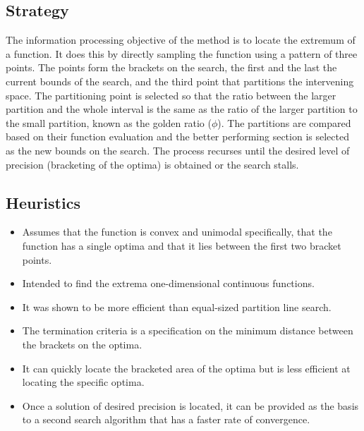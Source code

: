 \subsection{Strategy}
The information processing objective of the method is to locate the extremum of a function.
It does this by directly sampling the function using a pattern of three points. The points form the brackets on the search, the first and the last the current bounds of the search, and the third point that partitions the intervening space. The partitioning point is selected so that the ratio between the larger partition and the whole interval is the same as the ratio of the larger partition to the small partition, known as the golden ratio ($\phi$). The partitions are compared based on their function evaluation and the better performing section is selected as the new bounds on the search. The process recurses until the desired level of precision (bracketing of the optima) is obtained or the search stalls.

\subsection{Heuristics}

\begin{itemize}
	\item Assumes that the function is convex and unimodal specifically, that the function has a single optima and that it lies between the first two bracket points.
	\item Intended to find the extrema one-dimensional continuous functions.
	\item It was shown to be more efficient than equal-sized partition line search.
	\item The termination criteria is a specification on the minimum distance between the brackets on the optima.
	\item It can quickly locate the bracketed area of the optima but is less efficient at locating the specific optima.
	\item Once a solution of desired precision is located, it can be provided as the basis to a second search algorithm that has a faster rate of convergence.
\end{itemize}

